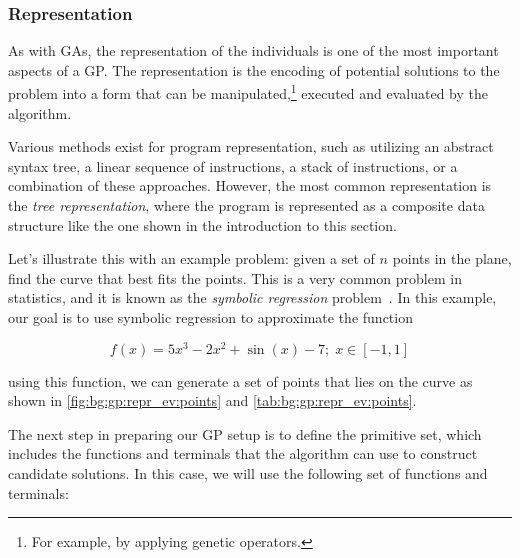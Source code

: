 \subsubsection{Representation}
\label{sec:bg:gp:repr_ev:repr}
  As with GAs, the representation of the individuals is one of the most 
  important aspects of a GP.
  The representation is the encoding of potential solutions to the problem into
  a form that can be manipulated,\footnote{
    For example, by applying genetic operators.
  } executed and evaluated by the algorithm.

  Various methods exist for program representation, such as utilizing an abstract 
  syntax tree, a linear sequence of instructions, a stack of instructions, or a 
  combination of these approaches.
  However, the most common representation is the \emph{tree representation}, where
  the program is represented as a composite data structure like the one shown in
  the introduction to this section.

  Let's illustrate this with an example problem: given a set of \(n\) points in
  the plane, find the curve that best fits the points.
  This is a very common problem in statistics, and it is known as the
  \emph{symbolic regression} 
  problem~\autocite{kozaGeneticProgrammingProgramming1992a}.
  In this example, our goal is to use symbolic regression to approximate the 
  function

  \begin{equation}
    f(x) = 5x^3 - 2x^2 + \sin(x) - 7;\; x \in [-1, 1]
  \end{equation}

  using this function, we can generate a set of points that lies on the curve as
  shown in \vref{fig:bg:gp:repr_ev:points} and 
  \vref{tab:bg:gp:repr_ev:points}.

  The next step in preparing our GP setup is to define the primitive set, which
  includes the functions and terminals that the algorithm can use to construct
  candidate solutions.
  In this case, we will use the following set of functions and terminals:

